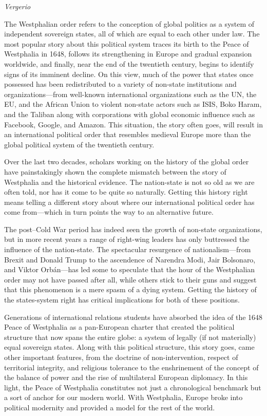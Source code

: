 \documentclass[
]{book}
\begin{document}
\emph{Vergerio}

The Westphalian order refers to the conception of global politics as a system of independent sovereign states, all of which are equal to each other under law. The most popular story about this political system traces its birth to the Peace of Westphalia in 1648, follows its strengthening in Europe and gradual expansion worldwide, and finally, near the end of the twentieth century, begins to identify signs of its imminent decline. On this view, much of the power that states once possessed has been redistributed to a variety of non-state institutions and organizations---from well-known international organizations such as the UN, the EU, and the African Union to violent non-state actors such as ISIS, Boko Haram, and the Taliban along with corporations with global economic influence such as Facebook, Google, and Amazon. This situation, the story often goes, will result in an international political order that resembles medieval Europe more than the global political system of the twentieth century.

Over the last two decades, scholars working on the history of the global order have painstakingly shown the complete mismatch between the story of Westphalia and the historical evidence. The nation-state is not so old as we are often told, nor has it come to be quite so naturally. Getting this history right means telling a different story about where our international political order has come from---which in turn points the way to an alternative future.

The post--Cold War period has indeed seen the growth of non-state organizations, but in more recent years a range of right-wing leaders has only buttressed the influence of the nation-state. The spectacular resurgence of nationalism---from Brexit and Donald Trump to the ascendence of Narendra Modi, Jair Bolsonaro, and Viktor Orbán---has led some to speculate that the hour of the Westphalian order may not have passed after all, while others stick to their guns and suggest that this phenomenon is a mere spasm of a dying system. Getting the history of the states-system right has critical implications for both of these positions.

Generations of international relations students have absorbed the idea of the 1648 Peace of Westphalia as a pan-European charter that created the political structure that now spans the entire globe: a system of legally (if not materially) equal sovereign states. Along with this political structure, this story goes, came other important features, from the doctrine of non-intervention, respect of territorial integrity, and religious tolerance to the enshrinement of the concept of the balance of power and the rise of multilateral European diplomacy. In this light, the Peace of Westphalia constitutes not just a chronological benchmark but a sort of anchor for our modern world. With Westphalia, Europe broke into political modernity and provided a model for the rest of the world.
\end{document}
